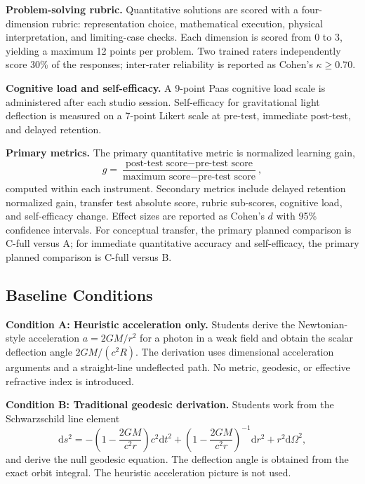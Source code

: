\documentclass{article}
\begin{document}
\textbf{Problem-solving rubric.} Quantitative solutions are scored with a four-dimension rubric: representation choice, mathematical execution, physical interpretation, and limiting-case checks. Each dimension is scored from 0 to 3, yielding a maximum 12 points per problem. Two trained raters independently score 30\% of the responses; inter-rater reliability is reported as Cohen's \(\kappa \ge 0.70\).

\textbf{Cognitive load and self-efficacy.} A 9-point Paas cognitive load scale is administered after each studio session. Self-efficacy for gravitational light deflection is measured on a 7-point Likert scale at pre-test, immediate post-test, and delayed retention.

\textbf{Primary metrics.} The primary quantitative metric is normalized learning gain,
\[
g = \frac{\text{post-test score} - \text{pre-test score}}{\text{maximum score} - \text{pre-test score}},
\]
computed within each instrument. Secondary metrics include delayed retention normalized gain, transfer test absolute score, rubric sub-scores, cognitive load, and self-efficacy change. Effect sizes are reported as Cohen's \(d\) with 95\% confidence intervals. For conceptual transfer, the primary planned comparison is C-full versus A; for immediate quantitative accuracy and self-efficacy, the primary planned comparison is C-full versus B.

\subsection{Baseline Conditions}

\textbf{Condition A: Heuristic acceleration only.} Students derive the Newtonian-style acceleration \(a = 2GM/r^{2}\) for a photon in a weak field and obtain the scalar deflection angle \(2GM/(c^{2}R)\). The derivation uses dimensional acceleration arguments and a straight-line undeflected path. No metric, geodesic, or effective refractive index is introduced.

\textbf{Condition B: Traditional geodesic derivation.} Students work from the Schwarzschild line element
\[
\mathrm{d}s^{2} = -\left(1-\frac{2GM}{c^{2}r}\right)c^{2}\mathrm{d}t^{2}
+ \left(1-\frac{2GM}{c^{2}r}\right)^{-1}\mathrm{d}r^{2}
+ r^{2}\mathrm{d}\Omega^{2},
\]
and derive the null geodesic equation. The deflection angle is obtained from the exact orbit integral. The heuristic acceleration picture is not used.
\end{document}

